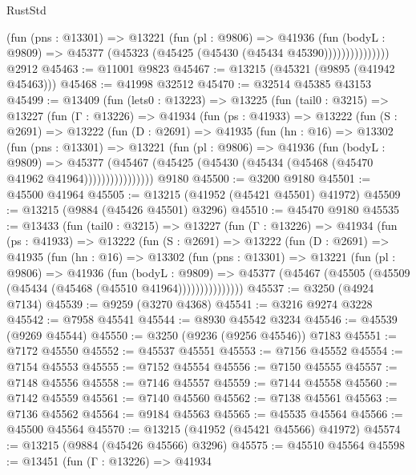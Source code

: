 \begin{lexlean}{RustStd}
\begin{coremodule}
                    (fun (pns : @13301) =>
                    @13221
                      (fun (pl : @9806) =>
                      @41936
                        (fun (bodyL : @9809) =>
                        @45377 (@45323 (@45425 (@45430 (@45434 @45390)))))))))))))))
    @2912
@45463 := @11001 @9823
@45467 := @13215 (@45321 (@9895 (@41942 @45463)))
@45468 := @41998 @32512
@45470 := @32514 @45385 @43153
@45499 := @13409
    (fun (lets0 : @13223) =>
    @13225
      (fun (tail0 : @3215) =>
      @13227
        (fun (Γ : @13226) =>
        @41934
          (fun (ps : @41933) =>
          @13222
            (fun (S : @2691) =>
            @13222
              (fun (D : @2691) =>
              @41935
                (fun (hn : @16) =>
                @13302
                  (fun (pns : @13301) =>
                  @13221
                    (fun (pl : @9806) =>
                    @41936
                      (fun (bodyL : @9809) =>
                      @45377
                        (@45467
                          (@45425 (@45430 (@45434 (@45468 (@45470 @41962 @41964))))))))))))))))
    @9180
@45500 := @3200 @9180
@45501 := @45500 @41964
@45505 := @13215 (@41952 (@45421 @45501) @41972)
@45509 := @13215 (@9884 (@45426 @45501) @3296)
@45510 := @45470 @9180
@45535 := @13433
    (fun (tail0 : @3215) =>
    @13227
      (fun (Γ : @13226) =>
      @41934
        (fun (ps : @41933) =>
        @13222
          (fun (S : @2691) =>
          @13222
            (fun (D : @2691) =>
            @41935
              (fun (hn : @16) =>
              @13302
                (fun (pns : @13301) =>
                @13221
                  (fun (pl : @9806) =>
                  @41936
                    (fun (bodyL : @9809) =>
                    @45377 (@45467 (@45505 (@45509 (@45434 (@45468 (@45510 @41964)))))))))))))))
@45537 := @3250 (@4924 @7134)
@45539 := @9259 (@3270 @4368)
@45541 := @3216 @9274 @3228
@45542 := @7958 @45541
@45544 := @8930 @45542 @3234
@45546 := @45539 (@9269 @45544)
@45550 := @3250 (@9236 (@9256 @45546)) @7183
@45551 := @7172 @45550
@45552 := @45537 @45551
@45553 := @7156 @45552
@45554 := @7154 @45553
@45555 := @7152 @45554
@45556 := @7150 @45555
@45557 := @7148 @45556
@45558 := @7146 @45557
@45559 := @7144 @45558
@45560 := @7142 @45559
@45561 := @7140 @45560
@45562 := @7138 @45561
@45563 := @7136 @45562
@45564 := @9184 @45563
@45565 := @45535 @45564
@45566 := @45500 @45564
@45570 := @13215 (@41952 (@45421 @45566) @41972)
@45574 := @13215 (@9884 (@45426 @45566) @3296)
@45575 := @45510 @45564
@45598 := @13451
    (fun (Γ : @13226) =>
    @41934

\end{coremodule}
\end{lexlean}
